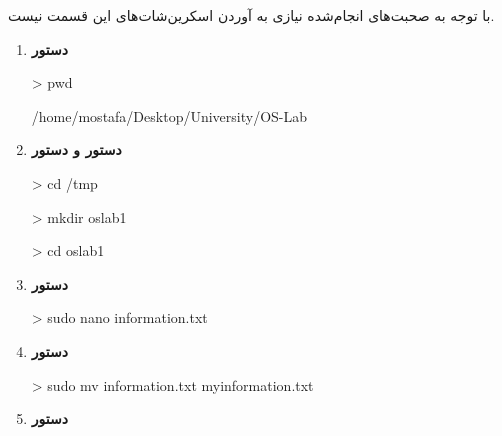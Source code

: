 
با توجه به صحبت‌های انجام‌شده نیازی به آوردن اسکرین‌شات‌های این قسمت نیست.

\begin{enumerate}
	\item 
		\textbf{دستور }
		
		\begin{code}
			> pwd
			
			/home/mostafa/Desktop/University/OS-Lab
		\end{code}
	\item 
		\textbf{دستور  و دستور }
		\begin{code}
			> cd /tmp
			
			> mkdir oslab1
			
			> cd oslab1
		\end{code}
	\item 
		\textbf{دستور }
		\begin{code}
			> sudo nano information.txt
		\end{code}
	
	\item 
		\textbf{دستور }
		\begin{code}
			> sudo mv information.txt myinformation.txt
		\end{code}
	\item 
		\textbf{دستور }
		

\end{enumerate}
